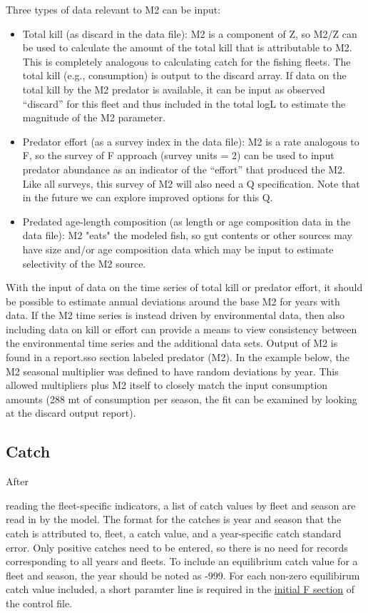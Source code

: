 Three types of data relevant to M2 can be input:

\begin{itemize}
	\item Total kill (as discard in the data file): M2 is a component of Z, so M2/Z can be used to calculate the amount of the total kill that is attributable to M2. This is completely analogous to calculating catch for the fishing fleets. The total kill (e.g., consumption) is output to the discard array. If data on the total kill by the M2 predator is available, it can be input as observed “discard” for this fleet and thus included in the total logL to estimate the magnitude of the M2 parameter.
	
	\item Predator effort (as a survey index in the data file): M2 is a rate analogous to F, so the survey of F approach (survey units = 2) can be used to input predator abundance as an indicator of the “effort” that produced the M2. Like all surveys, this survey of M2 will also need a Q specification. Note that in the future we can explore improved options for this Q.
	
	\item Predated age-length composition (as length or age composition data in the data file): M2 "eats" the modeled fish, so gut contents or other sources may have size and/or age composition data which may be input to estimate selectivity of the M2 source. 
\end{itemize}

With the input of data on the time series of total kill or predator effort, it should be possible to estimate annual deviations around the base M2 for years with data. If the M2 time series is instead driven by environmental data, then also including data on kill or effort can provide a means to view consistency between the environmental time series and the additional data sets. Output of M2 is found in a report.sso section labeled predator (M2). In the example below, the M2 seasonal multiplier was defined to have random deviations by year. This allowed multipliers plus M2 itself to closely match the input consumption amounts (288 mt of consumption per season, the fit can be examined by looking at the discard output report).


\subsection{Catch}
\hypertarget{CatchFormat}{After} reading the fleet-specific indicators, a list of catch values by fleet and season are read in by the model. The format for the catches is year and season that the catch is attributed to, fleet, a catch value, and a year-specific catch standard error. Only positive catches need to be entered, so there is no need for records corresponding to all years and fleets. To include an equilibrium catch value for a fleet and season, the year should be noted as -999. For each non-zero equilibirum catch value included, a short paramter line is required in the \hyperlink{InitF}{initial F section} of the control file.


